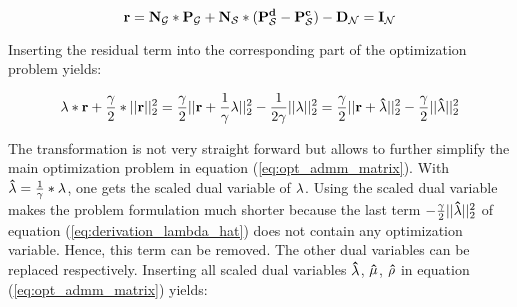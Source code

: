 \begin{equation}
	\vb{r} = \vb{N_\mathcal{G}}*\vb{P_\mathcal{G}} + \vb{N_\mathcal{S}}*(\vb{P_\mathcal{S}^d} - \vb{P_\mathcal{S}^c}) - \vb{D_\mathcal{N}} = \vb{I_\mathcal{N}}
\end{equation}

%

Inserting the residual term into the corresponding part of the optimization problem yields:

\begin{equation}
	\vb{\lambda} * \vb{r} + \frac{\gamma}{2} * || \vb{r} ||^2_2 = \frac{\gamma}{2} || \vb{r} + \frac{1}{\gamma}\vb{\lambda} ||^2_2 - \frac{1}{2\gamma}|| \vb{\lambda} ||^2_2 = \frac{\gamma}{2} || \vb{r} + \vb{\hat{\lambda}} ||^2_2 - \frac{\gamma}{2}|| \vb{\hat{\lambda}} ||^2_2 \label{eq:derivation_lambda_hat}
\end{equation}

The transformation is not very straight forward but allows to further simplify the main optimization problem in equation (\ref{eq:opt_admm_matrix}). With $\vb{\hat{\lambda}} = \frac{1}{\gamma}*\vb{\lambda}$, one gets the scaled dual variable of $\vb{\lambda}$. Using the scaled dual variable makes the problem formulation much shorter because the last term $- \frac{\gamma}{2}|| \vb{\hat{\lambda}} ||^2_2$ of equation (\ref{eq:derivation_lambda_hat}) does not contain any optimization variable. Hence, this term can be removed. The other dual variables can be replaced respectively. Inserting all scaled dual variables $\vb{\hat{\lambda}}$, $\vb{\hat{\mu}}$, $\vb{\hat{\rho}}$ in equation (\ref{eq:opt_admm_matrix}) yields:

